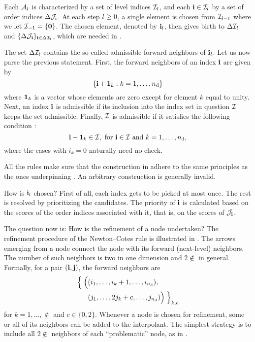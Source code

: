 Each $\mathcal{A}_{l}$ is characterized by a set of level indices
$\mathcal{I}_l$, and each $\mathbf{i} \in \mathcal{I}_l$ by a set of order indices
$\Delta\mathcal{J}_{\mathbf{i}}$. At each step $l \geq 0$, a single element is chosen from
$\mathcal{I}_{l-1}$ where we let $\mathcal{I}_{-1} = \{ \mathbf{0} \}$. The chosen element,
denoted by $\mathbf{i}_l$, then gives birth to $\Delta\mathcal{I}_l$ and $\{
\Delta\mathcal{J}_{\mathbf{i}} \}_{\mathbf{i} \in \Delta\mathcal{I}_l}$, which are needed in
.

The set $\Delta\mathcal{I}_l$ contains the so-called admissible forward neighbors
of $\mathbf{i}_l$. Let us now parse the previous statement. First, the forward
neighbors of an index $\mathbf{i}$ are given by
\[
  \left\{ \mathbf{i} + \mathbf{1}_k: k = 1, \dots, {n_\text{d}} \right\}
\]
where $\mathbf{1}_k$ is a vector whose elements are zero except for element $k$ equal
to unity. Next, an index $\mathbf{i}$ is admissible if its inclusion into the index set
in question $\mathcal{I}$ keeps the set admissible. Finally, $\mathcal{I}$ is admissible
if it satisfies the following condition \cite{klimke2006}:
\begin{equation} \elab{admissibility}
  \vi - \v{1}_k \in \lindex, \text{ for $\vi \in \lindex$ and $k = 1, \dots, \nin$,}
\end{equation}
where the cases with $i_k = 0$ naturally need no check.

\begin{remark}
All the rules make sure that the construction in  adhere to
the same principles as the ones underpinning . An
arbitrary construction is generally invalid.
\end{remark}

How is $\mathbf{i}_l$ chosen? First of all, each index gets to be picked at most once.
The rest is resolved by prioritizing the candidates. The priority of $\mathbf{i}$ is
calculated based on the scores of the order indices associated with it, that is,
on the scores of $\mathcal{J}_{\mathbf{i}}$.

The question now is: How is the refinement of a node undertaken? The refinement
procedure of the Newton--Cotes rule is illustrated in . The arrows
emerging from a node connect the node with its forward (next-level) neighbors.
The number of such neighbors is two in one dimension and $2 \nin$ in general.
Formally, for a pair $(\mathbf{i}, \mathbf{j})$, the forward neighbors are
\begin{align}
  \left\{\vphantom{\Big(}\right. \Big( &(i_1, \dots,   i_k + 1, \dots, i_\nin), \elab{neighbors} \\
                                       &(j_1, \dots, 2 j_k + c, \dots, j_\nin) \Big) \left.\vphantom{\Big)} \right\}_{k, c} \nonumber
\end{align}
for $k = 1, \dots, \nin$ and $c \in \{ 0, 2 \}$. Whenever a node is chosen for
refinement, some or all of its neighbors can be added to the interpolant. The
simplest strategy is to include all $2 \nin$ neighbors of each ``problematic''
node, as in \cite{ma2009}.

